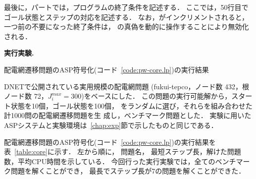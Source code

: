 最後に，パートでは，プログラムの終了条件を記述する．
ここでは，50行目でゴール状態とステップの対応を記述する．
なお，がインクリメントされると，一つ前の不要になった終了条件は，
の真偽を動的に操作することにより無効化される．

\textbf{実行実験.}
\begin{table*}[t]
  \centering
  \caption{配電網遷移問題のASP符号化(コード~\ref{code:pw-core.lp})の実行結果}
  \label{table:core}
  
\end{table*}
%
DNETで公開されている実用規模の配電網問題
({\sf fukui-tepco}，ノード数 432，根ノード数 72，$J_i^{max}=300$)をベースにした．
この問題の実行可能解から，スタート状態を10個，ゴール状態を100個，
をランダムに選び，それらを組み合わせた計1000問の配電網遷移問題を生
成し，ベンチマーク問題とした．
実験に用いたASPシステムと実験環境は~\ref{chap:exp}節で示したものと同じである．

配電網遷移問題のASP符号化(コード~\ref{code:pw-core.lp})の実行結果を
表~\ref{table:core}に示す．
左から順に，
問題名，
最短ステップ長，解けた問題数，平均CPU時間を示している．
今回行った実行実験では，全てのベンチマーク問題を解くことができ，
最長でステップ長が7の問題を解くことができた．






